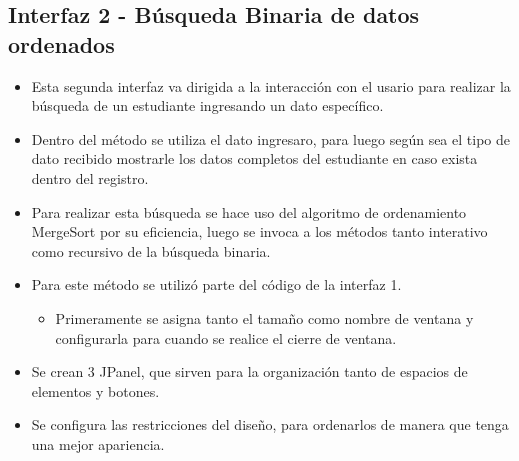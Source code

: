 \documentclass{article}
\begin{document}
    
    \subsection{Interfaz 2 - Búsqueda Binaria de datos ordenados}

    \begin{itemize}
        \item Esta segunda interfaz va dirigida a la interacción con el usario para realizar la búsqueda de un estudiante ingresando un dato específico.
        \item Dentro del método se utiliza el dato ingresaro, para luego según sea el tipo de dato recibido mostrarle los datos completos del estudiante en caso exista dentro del registro.
        \item Para realizar esta búsqueda se hace uso del algoritmo de ordenamiento MergeSort por su eficiencia, luego se invoca a los métodos tanto interativo como recursivo de la búsqueda binaria.
        \item Para este método se utilizó parte del código de la interfaz 1.
        \begin{itemize}
            \item Primeramente se asigna tanto el tamaño como nombre de ventana y configurarla para cuando se realice el cierre de ventana.
        \end{itemize}
    \end{itemize}
    

    \begin{itemize}
        \begin{itemize}
            \item Se crean 3 JPanel, que sirven para la organización tanto de espacios de elementos y botones.
        \end{itemize}
    \end{itemize}
    

    \begin{itemize}
        \begin{itemize}
            \item Se configura las restricciones del diseño, para ordenarlos de manera que tenga una mejor apariencia.
        \end{itemize}
    \end{itemize}
    
    
\end{document}
